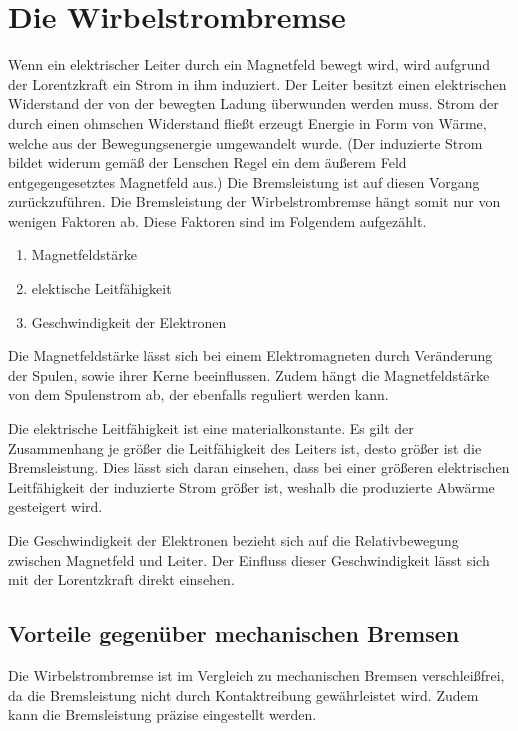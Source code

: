 



\section{Die Wirbelstrombremse}

Wenn ein elektrischer Leiter durch ein Magnetfeld bewegt wird,
wird aufgrund der Lorentzkraft ein Strom in ihm induziert.
Der Leiter besitzt einen elektrischen Widerstand der von der
bewegten Ladung überwunden werden muss. Strom der durch einen
ohmschen Widerstand fließt erzeugt Energie in Form von Wärme,
welche aus der Bewegungsenergie umgewandelt wurde.
(Der induzierte Strom bildet widerum gemäß der Lenschen Regel ein dem
äußerem Feld entgegengesetztes Magnetfeld aus.) Die Bremsleistung
ist auf diesen Vorgang zurückzuführen.
Die Bremsleistung der Wirbelstrombremse hängt somit nur von wenigen
Faktoren ab. Diese Faktoren sind im Folgendem aufgezählt.

\begin{enumerate}
  \item Magnetfeldstärke
  \item elektische Leitfähigkeit
  \item Geschwindigkeit der Elektronen
\end{enumerate}

Die Magnetfeldstärke lässt sich bei einem Elektromagneten durch
Veränderung der Spulen, sowie ihrer Kerne beeinflussen. Zudem hängt
die Magnetfeldstärke von dem Spulenstrom ab, der ebenfalls reguliert
werden kann.

Die elektrische Leitfähigkeit ist eine materialkonstante.
Es gilt der Zusammenhang je größer die Leitfähigkeit des Leiters ist,
desto größer ist die Bremsleistung.
Dies lässt sich daran einsehen, dass bei einer größeren
elektrischen Leitfähigkeit der induzierte Strom größer ist, weshalb
die produzierte Abwärme gesteigert wird.

Die Geschwindigkeit der Elektronen bezieht sich auf die
Relativbewegung zwischen Magnetfeld und Leiter. Der Einfluss dieser
Geschwindigkeit lässt sich mit der Lorentzkraft direkt einsehen.

\subsection{Vorteile gegenüber mechanischen Bremsen}

Die Wirbelstrombremse ist im Vergleich zu mechanischen Bremsen
verschleißfrei, da die Bremsleistung nicht durch Kontaktreibung
gewährleistet wird. Zudem kann die Bremsleistung präzise eingestellt
werden.

